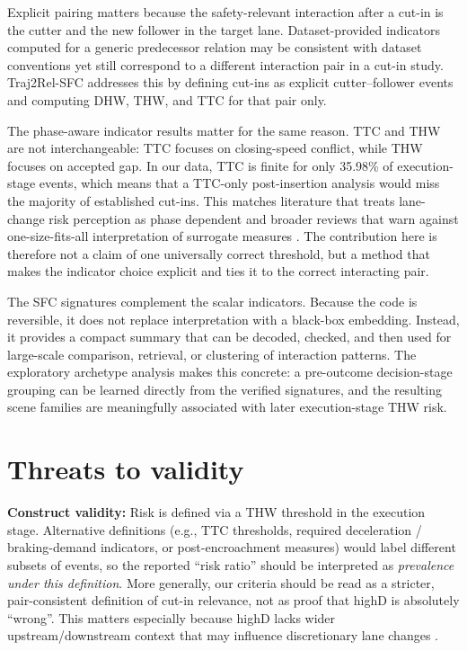 \documentclass[12pt,a4paper,twoside,openright]{report}
\newcommand{\FrameworkName}{Traj2Rel-SFC}
\begin{document}
    Explicit pairing matters because the safety-relevant interaction after a cut-in is the cutter and the new follower in the target lane. Dataset-provided indicators computed for a generic predecessor relation may be consistent with dataset conventions yet still correspond to a different interaction pair in a cut-in study. \FrameworkName{} addresses this by defining cut-ins as explicit cutter--follower events and computing DHW, THW, and TTC for that pair only.

    The phase-aware indicator results matter for the same reason. TTC and THW are not interchangeable: TTC focuses on closing-speed conflict, while THW focuses on accepted gap. In our data, TTC is finite for only 35.98\% of execution-stage events, which means that a TTC-only post-insertion analysis would miss the majority of established cut-ins. This matches literature that treats lane-change risk perception as phase dependent \cite{zhou2016riskperception} and broader reviews that warn against one-size-fits-all interpretation of surrogate measures \cite{wang2021ssm}. The contribution here is therefore not a claim of one universally correct threshold, but a method that makes the indicator choice explicit and ties it to the correct interacting pair.

    The SFC signatures complement the scalar indicators. Because the code is reversible, it does not replace interpretation with a black-box embedding. Instead, it provides a compact summary that can be decoded, checked, and then used for large-scale comparison, retrieval, or clustering of interaction patterns. The exploratory archetype analysis makes this concrete: a pre-outcome decision-stage grouping can be learned directly from the verified signatures, and the resulting scene families are meaningfully associated with later execution-stage THW risk.

    \section{Threats to validity}
    \textbf{Construct validity:} Risk is defined via a THW threshold in the execution stage. Alternative definitions (e.g., TTC thresholds, required deceleration / braking-demand indicators, or post-encroachment measures) would label different subsets of events, so the reported ``risk ratio'' should be interpreted as \emph{prevalence under this definition}. More generally, our criteria should be read as a stricter, pair-consistent definition of cut-in relevance, not as proof that highD is absolutely ``wrong''. This matters especially because highD lacks wider upstream/downstream context that may influence discretionary lane changes \cite{wanggao2025highd}.
\end{document}
